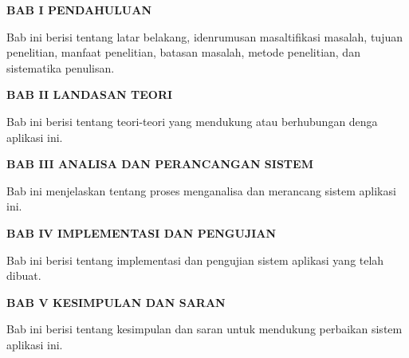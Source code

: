 \begin{flushleft}
\begin{itemize}
\begin{justify}
  \end{justify}
\end{itemize}


 \noindent \textbf{BAB I \hspace{1cm} PENDAHULUAN}
\begin{addmargin}[2.35cm]{0em}
Bab ini berisi tentang latar belakang, idenrumusan masaltifikasi masalah, tujuan penelitian, manfaat penelitian, batasan masalah, metode penelitian, dan sistematika penulisan.
\end{addmargin}
\noindent \textbf{BAB II \hspace{0.8cm} LANDASAN TEORI}
\begin{addmargin}[2.35cm]{0em}
Bab ini berisi tentang teori-teori yang mendukung atau berhubungan denga aplikasi ini.
\end{addmargin}
\noindent \textbf{BAB III \hspace{0.7cm} ANALISA DAN PERANCANGAN SISTEM}
\begin{addmargin}[2.35cm]{0em}
Bab ini menjelaskan tentang proses menganalisa dan merancang sistem aplikasi ini.
\end{addmargin}
\noindent \textbf{BAB IV \hspace{0.7cm} IMPLEMENTASI DAN PENGUJIAN}
\begin{addmargin}[2.35cm]{0em}
Bab ini berisi tentang implementasi dan pengujian sistem aplikasi yang telah dibuat.
\end{addmargin}
\noindent \textbf{BAB V \hspace{0.8cm} KESIMPULAN DAN SARAN}
\begin{addmargin}[2.35cm]{0em}
Bab ini berisi tentang kesimpulan dan saran untuk mendukung perbaikan sistem aplikasi ini.
\end{addmargin}


\end{flushleft}



\newpage